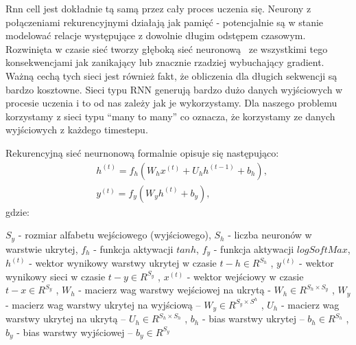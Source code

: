 Rnn cell jest dokładnie tą samą przez cały proces
uczenia się. Neurony z połączeniami rekurencyjnymi działają jak pamięć - potencjalnie są w stanie modelować relacje
występujące z dowolnie długim odstępem czasowym. 
Rozwinięta w czasie sieć tworzy głęboką sieć neuronową 
ze wszystkimi tego konsekwencjami jak zanikający lub znacznie rzadziej wybuchający gradient. 
Ważną cechą tych sieci jest również fakt, że obliczenia dla długich sekwencji są bardzo kosztowne.
Sieci typu RNN generują bardzo dużo danych wyjściowych w procesie uczenia i to od nas zależy jak je 
wykorzystamy. Dla naszego problemu korzystamy z sieci typu ``many to many'' co oznacza, że korzystamy
ze danych wyjściowych z każdego timestepu.

\newpage
Rekurencyjną sieć neurnonową formalnie opisuje się następująco:
\begin{align*}
  &h^{(t)} = f_h(W_hx^{(t)} + U_hh^{(t−1)} + b_h), \\
  &y^{(t)} = f_y(W_yh^{(t)} + b_y),
\end{align*}
gdzie:

$S_y$ - rozmiar alfabetu wejściowego (wyjściowego), \newline
$S_h$ - liczba neuronów w warstwie ukrytej, \newline
$f_h$ - funkcja aktywacji $tanh$, \newline
$f_y$ - funkcja aktywacji $logSoftMax$, \newline
$h^{(t)}$ - wektor wynikowy warstwy ukrytej w czasie $t - h \in R^{S_h}$ , \newline
$y^{(t)}$ - wektor wynikowy sieci w czasie $t - y \in R^{S_y}$ , \newline
$x^{(t)}$ - wektor wejściowy w czasie $t - x \in R^{S_y}$ ,\newline
$W_h$ - macierz wag warstwy wejściowej na ukrytą - $W_h \in R^{{S_h}\times{S_y}}$ , \newline
$W_y$ - macierz wag warstwy ukrytej na wyjściową – $W_y \in R^{{S_y} \times S^h}$ , \newline
$U_h$ - macierz wag warstwy ukrytej na ukrytą  – $U_h \in R^{{S_h} \times S_h}$ ,\newline
$b_h$ - bias warstwy ukrytej – $b_h \in R^{S_h}$ , \newline
$b_y$ - bias warstwy wyjściowej – $b_y \in R^{S_y}$ \newline

